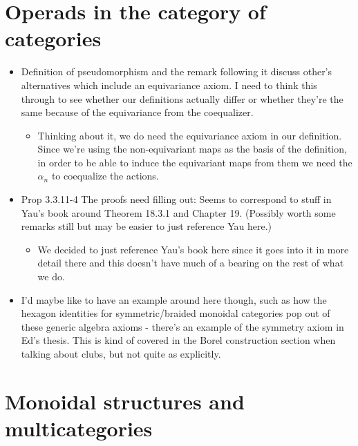 \documentclass{amsart}
\begin{document}
\section{Operads in the category of categories}
\begin{itemize}
\item Definition of pseudomorphism and the remark following it discuss other's alternatives which include an equivariance axiom. I need to think this through to see whether our definitions actually differ or whether they're the same because of the equivariance from the coequalizer.
	\begin{itemize}
		\item Thinking about it, we do need the equivariance axiom in our definition. Since we're using the non-equivariant maps as the basis of the definition, in order to be able to induce the equivariant maps from them we need the $\alpha_n$ to coequalize the actions.
	\end{itemize}
\item Prop 3.3.11-4 The proofs need filling out: Seems to correspond to stuff in Yau's book around Theorem 18.3.1 and Chapter 19. (Possibly worth some remarks still but may be easier to just reference Yau here.)
	\begin{itemize}
		\item We decided to just reference Yau's book here since it goes into it in more detail there and this doesn't have much of a bearing on the rest of what we do.
	\end{itemize}
\item I'd maybe like to have an example around here though, such as how the hexagon identities for symmetric/braided monoidal categories pop out of these generic algebra axioms - there's an example of the symmetry axiom in Ed's thesis. This is kind of covered in the Borel construction section when talking about clubs, but not quite as explicitly.
\end{itemize}

\section{Monoidal structures and multicategories}
\end{document}
